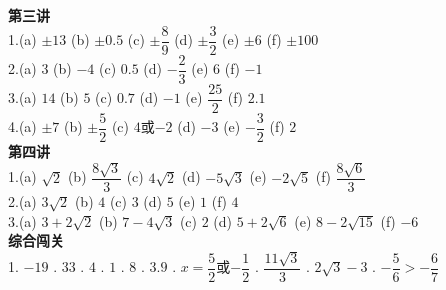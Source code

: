 \documentclass[a4paper,12pt]{ctexart}
\begin{document}
\textbf{第三讲}
\noindent\\
1.(a) $\pm13$ \quad (b) $\pm0.5$ \quad (c) $\pm\dfrac89$ \quad (d) $\pm\dfrac32$ \quad (e) $\pm6$ \quad (f) $\pm100$\\
2.(a) $3$ \quad (b) $-4$ \quad (c) $0.5$ \quad (d) $-\dfrac23$ \quad (e) $6$ \quad (f) $-1$\\
3.(a) $14$ \quad (b) $5$ \quad (c) $0.7$ \quad (d) $-1$ \quad (e) $\dfrac{25}{2}$ \quad (f) $2.1$\\
4.(a) $\pm7$ \quad (b) $\pm\dfrac52$ \quad (c) $4$或$-2$ \quad (d) $-3$ \quad (e) $-\dfrac32$ \quad (f) $2$\\

\textbf{第四讲}
\noindent\\
1.(a) $\sqrt2$ \quad (b) $\dfrac{8\sqrt3}{3}$ \quad (c) $4\sqrt2$ \quad (d) $-5\sqrt3$ \quad (e) $-2\sqrt5$ \quad (f) $\dfrac{8\sqrt6}{3}$\\
2.(a) $3\sqrt2$ \quad (b) $4$ \quad (c) $3$ \quad (d) $5$ \quad (e) $1$ \quad (f) $4$\\
3.(a) $3+2\sqrt2$ \quad (b) $7-4\sqrt3$ \quad (c) $2$ \quad (d) $5+2\sqrt6$ \quad (e) $8-2\sqrt{15}$ \quad (f) $-6$\\

\textbf{综合闯关}
\noindent\\
1. $-19$ . $33$ . $4$ . $1$ . $8$ . $3.9$ . $x=\dfrac52$或$-\dfrac12$ . $\dfrac{11\sqrt3}{3}$ . $2\sqrt3-3$ . $-\dfrac56>-\dfrac67$
\end{document}
